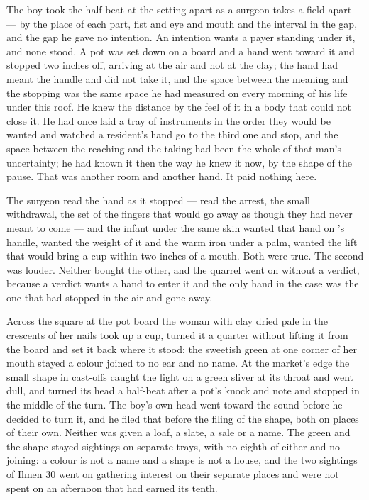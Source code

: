 The boy took the half-beat at the setting apart as a surgeon takes a field apart --- by the place of each part, fist and eye and mouth and the interval in the gap, and the gap he gave no intention. An intention wants a payer standing under it, and none stood. A pot was set down on a board and a hand went toward it and stopped two inches off, arriving at the air and not at the clay; the hand had meant the handle and did not take it, and the space between the meaning and the stopping was the same space he had measured on every morning of his life under this roof. He knew the distance by the feel of it in a body that could not close it. He had once laid a tray of instruments in the order they would be wanted and watched a resident's hand go to the third one and stop, and the space between the reaching and the taking had been the whole of that man's uncertainty; he had known it then the way he knew it now, by the shape of the pause. That was another room and another hand. It paid nothing here.

The surgeon read the hand as it stopped --- read the arrest, the small withdrawal, the set of the fingers that would go away as though they had never meant to come --- and the infant under the same skin wanted that hand on 's handle, wanted the weight of it and the warm iron under a palm, wanted the lift that would bring a cup within two inches of a mouth. Both were true. The second was louder. Neither bought the other, and the quarrel went on without a verdict, because a verdict wants a hand to enter it and the only hand in the case was the one that had stopped in the air and gone away.

Across the square at the pot board the woman with clay dried pale in the crescents of her nails took up a cup, turned it a quarter without lifting it from the board and set it back where it stood; the sweetish green at one corner of her mouth stayed a colour joined to no ear and no name. At the market's edge the small shape in cast-offs caught the light on a green sliver at its throat and went dull, and turned its head a half-beat after a pot's knock and note and stopped in the middle of the turn. The boy's own head went toward the sound before he decided to turn it, and he filed that before the filing of the shape, both on places of their own. Neither was given a loaf, a slate, a sale or a name. The green and the shape stayed sightings on separate trays, with no eighth of either and no joining: a colour is not a name and a shape is not a house, and the two sightings of Ilmen 30 went on gathering interest on their separate places and were not spent on an afternoon that had earned its tenth.

